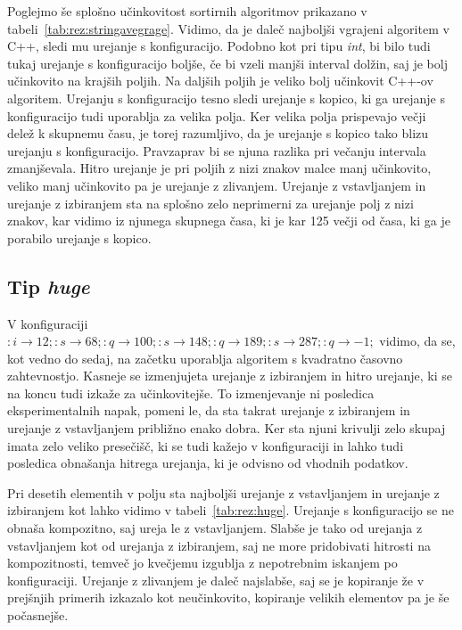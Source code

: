 \documentclass[a4paper,oneside,12pt]{article}
\newcommand{\lra}{\ensuremath{\longrightarrow}}
\begin{document}
Poglejmo še splošno učinkovitost sortirnih algoritmov prikazano v
tabeli~\ref{tab:rez:stringavegrage}. Vidimo, da je daleč najboljši vgrajeni
algoritem v C++, sledi mu urejanje s konfiguracijo. Podobno kot pri tipu
\emph{int}, bi bilo tudi tukaj urejanje s konfiguracijo boljše, če bi vzeli
manjši interval dolžin, saj je bolj učinkovito na krajših poljih. Na daljših
poljih je veliko bolj učinkovit \mbox{C++-ov} algoritem. Urejanju s konfiguracijo tesno
sledi urejanje s kopico, ki ga urejanje s konfiguracijo tudi uporablja za velika
polja. Ker velika polja prispevajo večji delež k skupnemu času, je torej
razumljivo, da je urejanje s kopico tako blizu urejanju s konfiguracijo.
Pravzaprav bi se njuna razlika pri večanju intervala zmanjševala.
Hitro urejanje je pri poljih z nizi znakov malce manj učinkovito, veliko manj
učinkovito pa je urejanje z zlivanjem. Urejanje z vstavljanjem in urejanje z
izbiranjem sta na splošno zelo neprimerni za urejanje polj z nizi znakov, kar
vidimo iz njunega skupnega časa, ki je kar 125 večji od časa, ki ga je porabilo
urejanje s kopico.

\subsection{Tip \emph{huge}}
V konfiguraciji $:i \lra 12;:s \lra 68;:q \lra 100;:s \lra 148;:q \lra 189;:s
\lra 287;:q \lra -1;$ vidimo, da se, kot vedno do sedaj, na začetku uporablja algoritem s kvadratno
časovno zahtevnostjo. Kasneje se izmenjujeta urejanje z izbiranjem in hitro
urejanje, ki se na koncu tudi izkaže za učinkovitejše. To izmenjevanje ni
posledica eksperimentalnih napak, pomeni le, da sta takrat urejanje z izbiranjem
in urejanje z vstavljanjem približno enako dobra. Ker sta njuni krivulji zelo
skupaj imata zelo veliko presečišč, ki se tudi kažejo v konfiguraciji in lahko
tudi posledica obnašanja hitrega urejanja, ki je odvisno od vhodnih podatkov.

Pri desetih elementih v polju sta najboljši urejanje z vstavljanjem in urejanje
z izbiranjem kot lahko vidimo v tabeli~\ref{tab:rez:huge}.
Urejanje s konfiguracijo se ne obnaša kompozitno, saj ureja le z
vstavljanjem. Slabše je tako od urejanja z vstavljanjem kot od urejanja z
izbiranjem, saj ne more pridobivati hitrosti na kompozitnosti, temveč jo
kvečjemu izgublja z nepotrebnim iskanjem po konfiguraciji. Urejanje z zlivanjem
je daleč najslabše, saj se je  kopiranje že v prejšnjih primerih izkazalo kot
neučinkovito, kopiranje velikih elementov pa je še počasnejše. 
\end{document}
